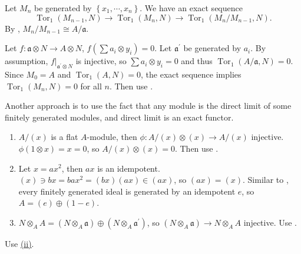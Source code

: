 \begin{exercise}\label{ex2.26}
	Let $M_n$ be generated by $\left\{x_1,\cdots,x_n\right\}$. We have an exact sequence
	\begin{equation*}
		\operatorname{Tor}_1\left(M_{n-1},N\right)\rightarrow\operatorname{Tor}_1\left(M_n,N\right)\rightarrow\operatorname{Tor}_1\left(M_n/M_{n-1},N\right).
	\end{equation*}
	By , $M_n/M_{n-1}\cong A/\mathfrak{a}$.
	
	Let $f:\mathfrak{a}\otimes N\rightarrow A\otimes N$, $f\left(\sum a_i\otimes y_i\right)=0$. Let $\mathfrak{a}^\prime$ be generated by $a_i$. By assumption, $f|_{\mathfrak{a}^\prime\otimes N}$ is injective, so $\sum a_i\otimes y_i=0$ and thus $\operatorname{Tor}_1(A/\mathfrak{a},N)=0$. Since $M_0=A$ and $\operatorname{Tor}_1\left(A,N\right)=0$, the exact sequence implies $\operatorname{Tor}_1\left(M_n,N\right)=0$ for all $n$. Then use .
	
	\textcolor{green!70!black}{Another approach is to use the fact that any module is the direct limit of some finitely generated modules, and direct limit is an exact functor.}
\end{exercise}

\begin{exercise}\label{ex2.27}
		\begin{enumerate}
		\item[(i) $\Rightarrow$ (ii)] $A/(x)$ is a flat $A$-module, then $\phi:A/(x)\otimes(x)\rightarrow A/(x)$ injective. $\phi(1\otimes x)=x=0$, so $A/(x)\otimes(x)=0$. Then use .
		\item[(ii) $\Rightarrow$ (iii)] Let $x=ax^2$, then $ax$ is an idempotent. $(x)\ni bx=bax^2=(bx)(ax)\in(ax)$, so $(ax)=(x)$. Similar to , every finitely generated ideal is generated by an idempotent $e$, so $A=(e)\oplus(1-e)$.
		\item[(iii) $\Rightarrow$ (i)] $N\otimes_AA=\left(N\otimes_A\mathfrak{a}\right)\oplus\left(N\otimes_A\mathfrak{a}^\prime\right)$, so $\left(N\otimes_A\mathfrak{a}\right)\rightarrow N\otimes_AA$ injective. Use .
	\end{enumerate}
\end{exercise}

\begin{exercise}\label{ex2.28}
	Use \hyperref[ex2.27]{(ii)}.
\end{exercise}